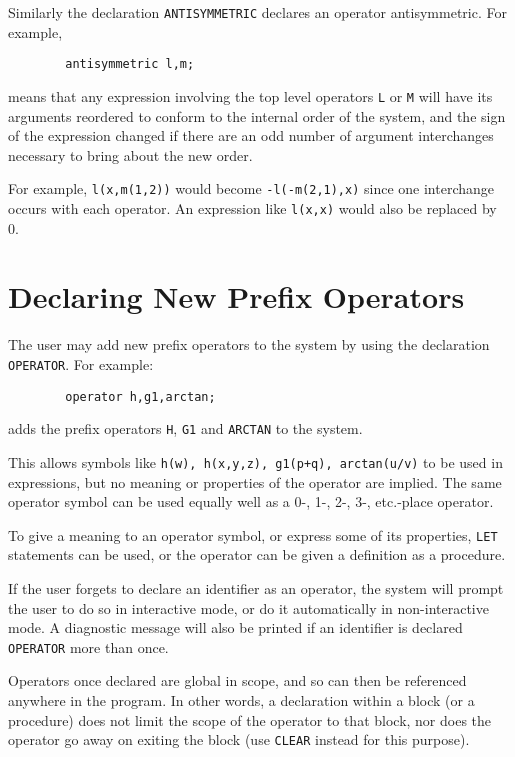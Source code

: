 Similarly the declaration \texttt{ANTISYMMETRIC}
declares an operator antisymmetric.   For example,
\begin{verbatim}
        antisymmetric l,m;
\end{verbatim}
means that any expression involving the top level operators \texttt{L} or
\texttt{M} will have its arguments reordered to conform to the internal order
of the system, and the sign of the expression changed if there are an odd
number of argument interchanges necessary to bring about the new order.

For example, \texttt{l(x,m(1,2))} would become \texttt{-l(-m(2,1),x)} since one
interchange occurs with each operator.  An expression like \texttt{l(x,x)}
would also be replaced by 0.

\section{Declaring New Prefix Operators}
\hypertarget{command:OPERATOR}{}

The user may add new prefix operators to the system by
using the declaration \texttt{OPERATOR}. For example:
\begin{verbatim}
        operator h,g1,arctan;
\end{verbatim}
adds the prefix operators \texttt{H}, \texttt{G1} and \texttt{ARCTAN} to the system.

This allows symbols like \texttt{h(w), h(x,y,z), g1(p+q), arctan(u/v)} to be
used in expressions, but no meaning or properties of the operator are
implied.  The same operator symbol can be used equally well as a 0-, 1-, 2-,
3-, etc.-place operator.

To give a meaning to an operator symbol, or express some of its
properties, \texttt{LET} statements can be used, or the operator
can be given a definition as a procedure.

If the user forgets to declare an identifier as an operator, the system
will prompt the user to do so in interactive mode, or do it automatically
in non-interactive mode. A diagnostic message will also be printed if an
identifier is declared \texttt{OPERATOR} more than once.

Operators once declared are global in scope, and so can then be referenced
anywhere in the program.  In other words, a declaration within a block (or
a procedure) does not limit the scope of the operator to that block, nor
does the operator go away on exiting the block (use \texttt{CLEAR} instead
for this purpose).

